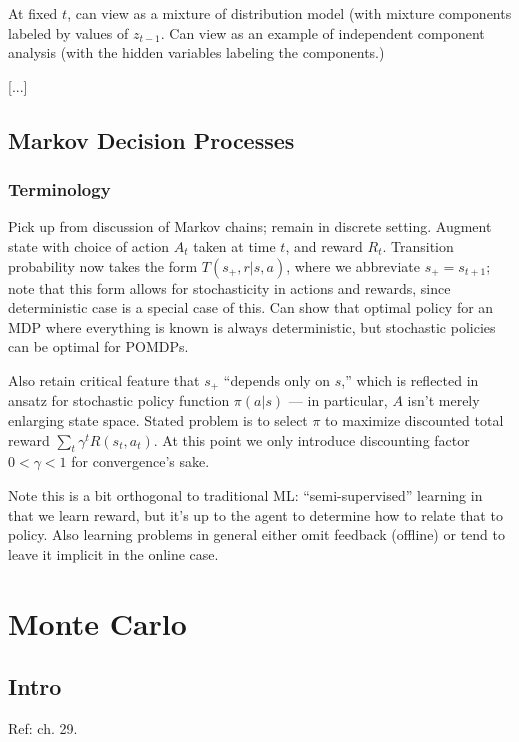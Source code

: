 \documentclass[notitlepage,openany,11pt]{report}
\numberwithin{equation}{section}
\theoremstyle{plain}%
\begin{document}
At fixed $t$, can view as a mixture of distribution model (with mixture components labeled by values of $z_{t-1}$. Can view as an example of independent component analysis (with the hidden variables labeling the components.) 



[...]


\subsection{Markov Decision Processes} 

\subsubsection{Terminology} Pick up from discussion of Markov chains; remain in discrete setting. Augment state with choice of action $A_{t}$ taken at time $t$, and reward $R_{t}$. Transition probability now takes the form $T(s_{+}, r | s, a)$, where we abbreviate $s_{+} = s_{t+1}$; note that this form allows for stochasticity in actions and rewards, since deterministic case is a special case of this. Can show that optimal policy for an MDP where everything is known is always deterministic, but stochastic policies can be optimal for POMDPs. 

Also retain critical feature that $s_{+}$ ``depends only on $s$,''  which is reflected in ansatz for stochastic policy function $\pi(a|s)$ --- in particular, $A$ isn't merely enlarging state space. Stated problem is to select $\pi$ to maximize discounted total reward $\sum_{t} \gamma^{t} R(s_{t}, a_{t})$. At this point we only introduce discounting factor $0 < \gamma < 1$ for convergence's sake.

Note this is a bit orthogonal to traditional ML: ``semi-supervised'' learning in that we learn reward, but it's up to the agent to determine how to relate that to policy. Also learning problems in general either omit feedback (offline) or tend to leave it implicit in the online case.

\section{Monte Carlo} 

\subsection{Intro} Ref: \cite{MacKay:03} ch. 29.
\end{document}
